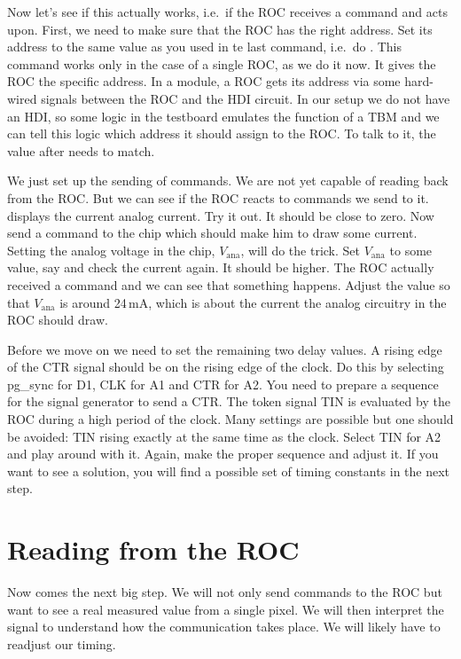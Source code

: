 Now let's see if this actually works, i.e.~if the \gls{ROC} receives a command and acts upon. First, we need to make sure that the \gls{ROC} has the right address. Set its address to the same value as you used in te last  command, i.e.~do . This command works only in the case of a single \gls{ROC}, as we do it now. It gives the \gls{ROC} the specific address. In a module, a \gls{ROC} gets its address via some hard-wired signals between the \gls{ROC} and the \gls{HDI} circuit. In our setup we do not have an \gls{HDI}, so some logic in the testboard emulates the function of a \gls{TBM} and we can tell this logic which address it should assign to the \gls{ROC}. To talk to it, the value after  needs to match.

We just set up the sending of commands. We are not yet capable of reading back from the \gls{ROC}. But we can see if the \gls{ROC} reacts to commands we send to it.  displays the current analog current. Try it out. It should be close to zero. Now send a command to the chip which should make him to draw some current. Setting the analog voltage in the chip, $V_\text{ana}$, will do the trick. Set $V_\text{ana}$ to some value, say  and check the current again. It should be higher. The \gls{ROC} actually received a command and we can see that something happens. Adjust the value so that $V_\text{ana}$ is around 24\,mA, which is about the current the analog circuitry in the \gls{ROC} should draw.

Before we move on we need to set the remaining two delay values. A rising edge of the CTR signal should be on the rising edge of the clock. Do this by selecting pg\_sync for D1, CLK for A1 and CTR for A2. You need to prepare a sequence for the signal generator to send a CTR. The token signal TIN is evaluated by the \gls{ROC} during a high period of the clock. Many settings are possible but one should be avoided: TIN rising exactly at the same time as the clock. Select TIN for A2 and play around with it. Again, make the proper sequence and adjust it. If you want to see a solution, you will find a possible set of timing constants in the next step.

\section{Reading from the ROC}

Now comes the next big step. We will not only send commands to the \gls{ROC} but want to see a real measured value from a single pixel. We will then interpret the signal to understand how the communication takes place. We will likely have to readjust our timing.

